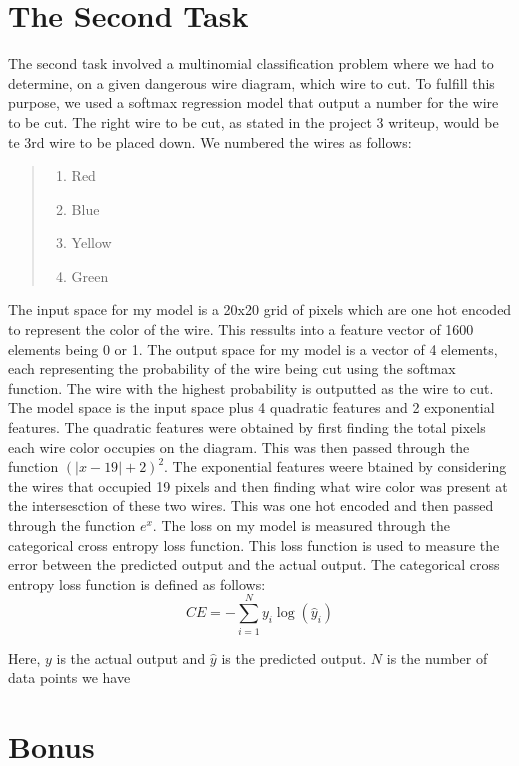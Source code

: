 \documentclass{article}
\begin{document}
\section*{The Second Task}
The second task involved a multinomial classification problem where we had to determine, on a given dangerous wire diagram, which wire to cut.
To fulfill this purpose, we used a softmax regression model that output a number for the wire to be cut. The right wire to be cut, as stated in the project 3 writeup, would be te 3rd wire to be placed down.\newline
\newline
We numbered the wires as follows:
\begin{quote}
    \begin{enumerate}
    \item Red
    \item Blue
    \item Yellow
    \item Green
    \end{enumerate}
\end{quote}

\noindent The input space for my model is a 20x20 grid of pixels which are one hot encoded to represent the color of the wire.
This ressults into a feature vector of 1600 elements being 0 or 1.\newline
\newline The output space for my model is a vector of 4 elements, each representing the probability of the wire being cut using the softmax function.
The wire with the highest probability is outputted as the wire to cut.\newline
\newline The model space is the input space plus 4 quadratic features and 2 exponential features.
The quadratic features were obtained by first finding the total pixels each wire color occupies on the diagram. This was then passed through the function $(| x - 19 | + 2)^2$.
The exponential features weere btained by considering the wires that occupied 19 pixels and then finding what wire color was present at the intersesction of these two wires. 
This was one hot encoded and then passed through the function $e^{x}$.\newline
\newline The loss on my model is measured through the categorical cross entropy loss function. 
This loss function is used to measure the error between the predicted output and the actual output. The categorical cross entropy loss function is defined as follows:
\begin{equation}
    CE = -\sum_{i=1}^{N} y_{i} \log(\hat{y}_{i})
\end{equation}

\noindent Here, $y$ is the actual output and $\hat{y}$ is the predicted output. $N$ is the number of data points we have
\section*{Bonus}
\end{document}
